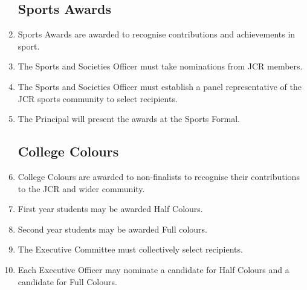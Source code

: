 \documentclass[12pt]{article}
\begin{document}
\begin{enumerate}
    \subsection{Sports Awards}
    \item Sports Awards are awarded to recognise contributions and achievements in sport.
    \item The Sports and Societies Officer must take nominations from JCR members.
    \item The Sports and Societies Officer must establish a panel representative of the JCR sports community to select recipients.
    \item The Principal will present the awards at the Sports Formal.
    \subsection{College Colours}
    \item College Colours are awarded to non-finalists to recognise their contributions to the JCR and wider community.
    \item First year students may be awarded Half Colours.
    \item Second year students may be awarded Full colours.
    \item The Executive Committee must collectively select recipients.
    \item Each Executive Officer may nominate a candidate for Half Colours and a candidate for Full Colours.
\end{enumerate}
\end{document}
